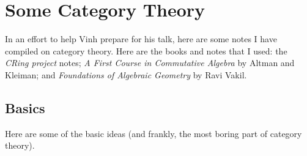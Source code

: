 \chapter{Some Category Theory}
In an effort to help Vinh prepare for his talk, here are some notes I have
compiled on category theory. Here are the books and notes that I used:
the \emph{CRing project} notes; \emph{A First Course in Commutative
  Algebra} by Altman and Kleiman; and \emph{Foundations of Algebraic
  Geometry} by Ravi Vakil.

\section{Basics}
Here are some of the basic ideas (and frankly, the most boring part of
category theory).

